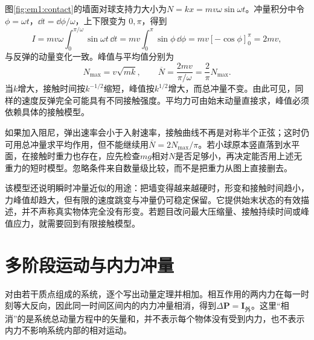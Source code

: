 
图\ref{fig:em1:contact}的墙面对球支持力大小为$N=kx=mv\omega\sin\omega t$。冲量积分中令 $\phi=\omega t$，$\dd t=\dd\phi/\omega$，上下限变为 $0,\pi$，得到
\[
I=mv\omega\int_0^{\pi/\omega}\sin\omega t\,\dd t
=mv\int_0^\pi\sin\phi\,\dd\phi
=mv[-\cos\phi]_0^\pi=2mv,
\]
与反弹的动量变化一致。峰值与平均值分别为
\[N_{\max}=v\sqrt{mk},\qquad\overline N=\frac{2mv}{\pi/\omega}=\frac2\pi N_{\max}.\]
当$k$增大，接触时间按$k^{-1/2}$缩短，峰值按$k^{1/2}$增大，而总冲量不变。由此可见，同样的速度反弹完全可能具有不同接触强度。平均力可由始末动量直接求，峰值必须依赖具体的接触模型。

如果加入阻尼，弹出速率会小于入射速率，接触曲线不再是对称半个正弦；这时仍可用总冲量求平均作用，但不能继续用$\overline N=2N_{\max}/\pi$。若小球原本竖直落到水平面，在接触时重力也存在，应先检查$mg$相对$N$是否足够小，再决定能否用上述无重力的短时模型。忽略条件来自数量级比较，而不是把重力从图上直接删去。

该模型还说明瞬时冲量近似的用途：把墙变得越来越硬时，形变和接触时间趋小，力峰值却趋大，但有限的速度跳变与冲量仍可稳定保留。它提供始末状态的有效描述，并不声称真实物体完全没有形变。若题目改问最大压缩量、接触持续时间或峰值应力，就需要回到有限接触模型。
\section{多阶段运动与内力冲量}

对由若干质点组成的系统，逐个写出动量定理并相加。相互作用的两内力在每一时刻等大反向，因此同一时间区间内的内力冲量相消，得到$\Delta\bm P=\bm I_{\text{外}}$。这里“相消”的是系统总动量方程中的矢量和，并不表示每个物体没有受到内力，也不表示内力不影响系统内部的相对运动。

